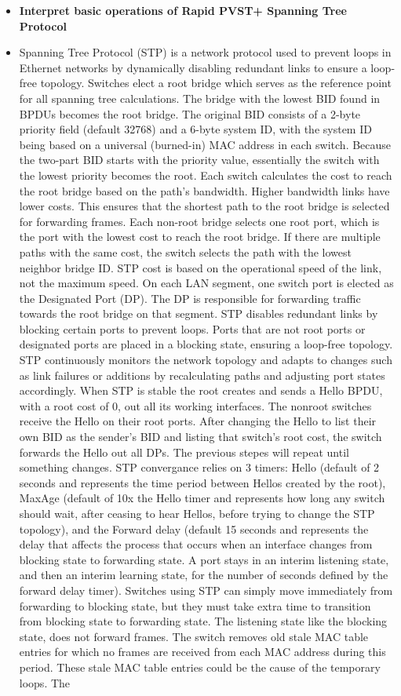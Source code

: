\documentclass{article}
\begin{document}
\begin{itemize}
  \item \textbf{Interpret basic operations of Rapid PVST+ Spanning Tree Protocol}
  	\item[] Spanning Tree Protocol (STP) is a network protocol used to prevent loops in Ethernet networks by dynamically disabling redundant links to ensure a loop-free topology. Switches elect a root bridge which serves as the reference point for all spanning tree calculations. The bridge with the lowest BID found in BPDUs becomes the root bridge. The original BID consists of a 2-byte priority field (default 32768) and a 6-byte system ID, with the system ID being based on a universal (burned-in) MAC address in each switch. Because the two-part BID starts with the priority value, essentially the switch with the lowest priority becomes the root. Each switch calculates the cost to reach the root bridge based on the path's bandwidth. Higher bandwidth links have lower costs. This ensures that the shortest path to the root bridge is selected for forwarding frames. Each non-root bridge selects one root port, which is the port with the lowest cost to reach the root bridge. If there are multiple paths with the same cost, the switch selects the path with the lowest neighbor bridge ID. STP cost is based on the operational speed of the link, not the maximum speed. On each LAN segment, one switch port is elected as the Designated Port (DP). The DP is responsible for forwarding traffic towards the root bridge on that segment. STP disables redundant links by blocking certain ports to prevent loops. Ports that are not root ports or designated ports are placed in a blocking state, ensuring a loop-free topology. STP continuously monitors the network topology and adapts to changes such as link failures or additions by recalculating paths and adjusting port states accordingly. When STP is stable the root creates and sends a Hello BPDU, with a root cost of 0, out all its working interfaces. The nonroot switches receive the Hello on their root ports. After changing the Hello to list their own BID as the sender's BID and listing that switch's root cost, the switch forwards the Hello out all DPs. The previous stepes will repeat until something changes. STP convergance relies on 3 timers: Hello (default of 2 seconds and represents the time period between Hellos created by the root), MaxAge (default of 10x the Hello timer and represents how long any switch should wait, after ceasing to hear Hellos, before trying to change the STP topology), and the Forward delay (default 15 seconds and represents the delay that affects the process that occurs when an interface changes from blocking state to forwarding state. A port stays in an interim listening state, and then an interim learning state, for the number of seconds defined by the forward delay timer). Switches using STP can simply move immediately from forwarding to blocking state, but they must take extra time to transition from blocking state to forwarding state. The listening state like the blocking state, does not forward frames. The switch removes old stale MAC table entries for which no frames are received from each MAC address during this period. These stale MAC table entries could be the cause of the temporary loops. The 
\end{itemize}
\end{document}
